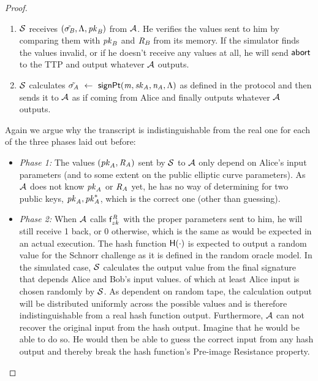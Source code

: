 \begin{proof}
\begin{enumerate}
        \item $\mathcal{S}$ receives $(\tilde{\sigma_{\mathit{B}}}, \Lambda, \mathit{pk}_{\mathit{B}})$ from $\mathcal{A}$.
        He verifies the values sent to him by comparing them with $\mathit{pk}_{\mathit{B}}$ and $\mathit{R}_{\mathit{B}}$ from its memory.
        If the simulator finds the values invalid, or if he doesn't receive any values at all, he will send $\mathsf{abort}$ to the TTP and output whatever $\mathcal{A}$ outputs.
        \item $\mathcal{S}$ calculates $\tilde{\sigma_{\mathit{A}}} ~\leftarrow~ \mathsf{signPt}(\mathit{m}, \mathit{sk}_{\mathit{A}}, \mathit{\mathit{n}_{\mathit{A}}}, \Lambda)$ as defined in the protocol and then sends it to $\mathcal{A}$ as if coming from Alice and finally outputs whatever $\mathcal{A}$ outputs.
    \end{enumerate}
    Again we argue why the transcript is indistinguishable from the real one for each of the three phases laid out before:
    \begin{itemize}
        \item \textit{Phase 1: } The values $(\mathit{pk}_{\mathit{A}}, \mathit{R}_{\mathit{A}})$ sent by $\mathcal{S}$ to $\mathcal{A}$ only depend on Alice's input parameters (and to some extent on the public elliptic curve parameters).
        As $\mathcal{A}$ does not know $\mathit{pk}_{\mathit{A}}$ or $\mathit{R}_{\mathit{A}}$ yet, he has no way of determining for two public keys, $\mathit{pk}_{\mathit{A}}, \mathit{pk}_{\mathit{A}}^*$, which is the correct one (other than guessing).
        \item \textit{Phase 2: } When $\mathcal{A}$ calls $\mathsf{f}^{\mathit{R}}_{zk}$ with the proper parameters sent to him, he will still receive 1 back, or 0 otherwise, which is the same as would be expected in an actual execution.
        The hash function $\mathsf{H} (\cdot)$ is expected to output a random value for the Schnorr challenge as it is defined in the random oracle model.
        In the simulated case, $\mathcal{S}$ calculates the output value from the final signature that depends Alice and Bob's input values. of which at least Alice input is chosen randomly by $\mathcal{S}$.
        As dependent on random tape, the calculation output will be distributed uniformly across the possible values and is therefore indistinguishable from a real hash function output.
        Furthermore, $\mathcal{A}$ can not recover the original input from the hash output.
        Imagine that he would be able to do so. He would then be able to guess the correct input from any hash output and thereby break the hash function's Pre-image Resistance property.

\end{itemize}
\end{proof}
